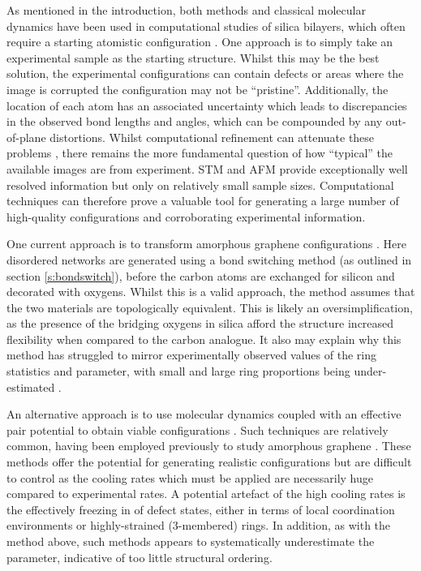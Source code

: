 As mentioned in the  introduction, both \abinitio{} methods and classical molecular dynamics have been used in computational studies of silica bilayers, which often require a starting atomistic configuration  \cite{Bjorkman2013,Malashevich2016,Wilson2013,Roy2018}.  
One approach is to simply take an experimental sample as the starting structure. 
Whilst this may be the best solution, the experimental configurations can contain defects or areas where the image is corrupted \ie{} the configuration may not be ``pristine''.
Additionally, the location of each atom has an associated uncertainty which leads to discrepancies in the observed bond lengths and angles, which can be compounded by any out\--of\--plane distortions.
Whilst computational refinement can attenuate these problems \cite{Sadjadi2017,Wilson2018}, there remains the more fundamental question of how ``typical'' the available images are from experiment.
STM and AFM provide exceptionally well resolved information but only on relatively small sample sizes.
Computational techniques can therefore prove a valuable tool for generating a large number of high\--quality configurations and corroborating experimental information.  

One current approach is to transform amorphous graphene configurations \cite{Wilson2013}.
Here disordered networks are generated using a bond switching method (as outlined in section \ref{s:bondswitch}), before the carbon atoms are exchanged for silicon and decorated with oxygens.
Whilst this is a valid approach, the method assumes that the two materials are topologically equivalent.
This is likely an oversimplification, as the presence of the bridging oxygens in silica afford the structure increased flexibility when compared to the carbon analogue.
It also may explain why this method has struggled to mirror experimentally observed values of the ring statistics and \aw{} parameter, with small and large ring proportions being under\--estimated \cite{Kumar2014}.

An alternative approach is to use molecular dynamics coupled with an effective pair potential to obtain viable configurations \cite{Roy2018}.
Such techniques are relatively common, having been employed previously to study amorphous graphene \cite{Kumar2012}. 
These methods offer the potential for generating realistic configurations but are difficult to control as the cooling rates which must be applied are necessarily huge compared to experimental rates. 
A potential artefact of the high cooling rates is the effectively freezing in of defect states, either in terms of local coordination environments or highly\--strained (3-membered) rings.
In addition, as with the method above, such methods appears to systematically underestimate the \aw{} parameter, indicative of too little structural ordering.

